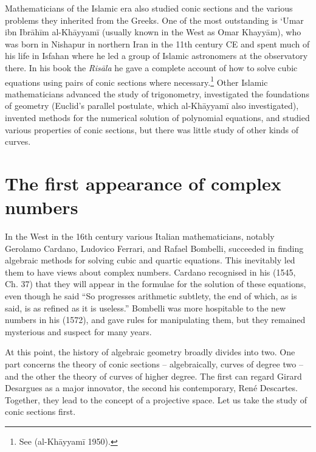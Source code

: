 Mathematicians of the Islamic era  also studied conic sections and the various problems they inherited from the Greeks. One of the most outstanding is `Umar ibn Ibr\={a}h\={i}m al-Kh\={a}yyam\={i} (usually known in the West as Omar Khayy\={a}m), who was born in Nishapur in northern Iran  in the 11th century CE and spent much of his life in Isfahan where he led a group of Islamic astronomers at the observatory there. In his book the \emph{Ris\={a}la} he 
 gave a complete account of how to solve cubic equations using pairs of conic sections where necessary.\footnote{See (al-Kh\={a}yyam\={i} 1950).} Other Islamic mathematicians advanced the study of trigonometry, investigated the foundations of geometry (Euclid's parallel postulate, which al-Kh\={a}yyam\={i} also investigated), invented methods for the numerical solution of polynomial equations, and studied various properties of conic sections, but there was little study of other kinds of curves. 
 
\section{The first appearance of complex numbers} 
In the West in the 16th century various Italian mathematicians, notably Gerolamo Cardano, Ludovico Ferrari,  and Rafael Bombelli, succeeded in finding algebraic methods for solving cubic and quartic equations. This inevitably led them to have views about complex numbers. Cardano recognised in his  (1545, Ch. 37) that they will appear in the formulae for the solution of these equations, even though he said ``So progresses arithmetic subtlety, the end of which, as is said, is as refined as it is useless.'' Bombelli was more hospitable to the new numbers in his  (1572), and gave rules for manipulating them, but they remained mysterious and suspect for many years.



At this point, the history of algebraic geometry broadly divides into two. One part concerns the theory of conic sections -- algebraically, curves of degree two -- and the other the theory of curves of higher degree. The first can regard Girard Desargues as a major innovator, the second his contemporary,  Ren\'e Descartes. Together, they lead to the concept of a projective space. Let us take the study of conic sections first. 



